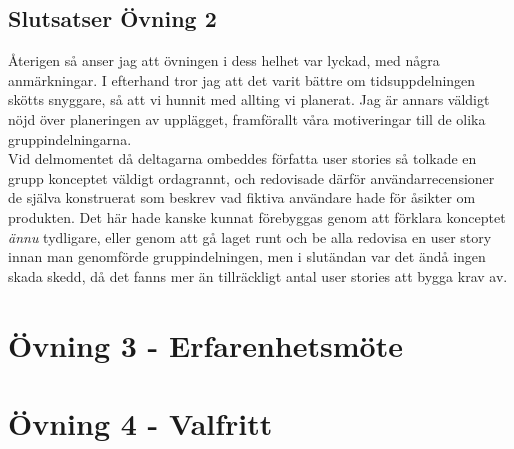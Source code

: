 \documentclass[a4paper, titlepage,12pt]{article}
\begin{document}
			\subsection{Slutsatser Övning 2}

				Återigen så anser jag att övningen i dess helhet var lyckad, med några anmärkningar. I efterhand tror jag att det varit bättre om tidsuppdelningen skötts snyggare, så att vi hunnit med allting vi planerat. Jag är annars väldigt nöjd över planeringen av upplägget, framförallt våra motiveringar till de olika gruppindelningarna.\\

				Vid delmomentet då deltagarna ombeddes författa user stories så tolkade en grupp konceptet väldigt ordagrannt, och redovisade därför användarrecensioner de själva konstruerat som beskrev vad fiktiva användare hade för åsikter om produkten. Det här hade kanske kunnat förebyggas genom att förklara konceptet \emph{ännu} tydligare, eller genom att gå laget runt och be alla redovisa en user story innan man genomförde gruppindelningen, men i slutändan var det ändå ingen skada skedd, då det fanns mer än tillräckligt antal user stories att bygga krav av.

	\section{Övning 3 - Erfarenhetsmöte}
	\section{Övning 4 - Valfritt}
\end{document}
